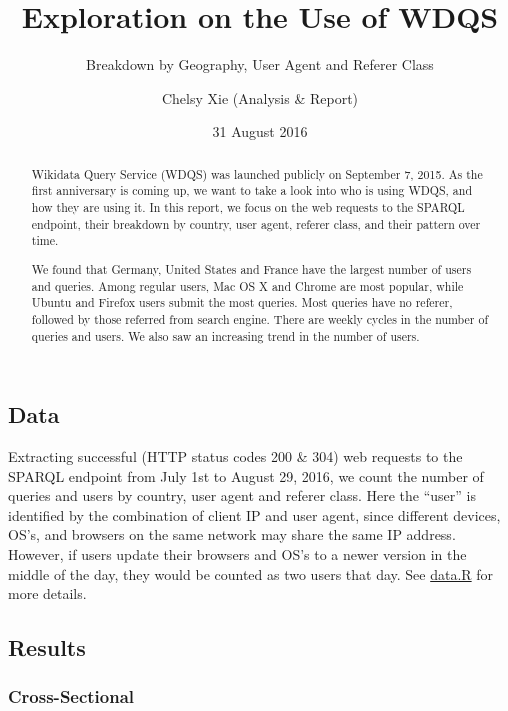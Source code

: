 \documentclass[12pt,]{article}
\title{Exploration on the Use of WDQS}
\subtitle{Breakdown by Geography, User Agent and Referer Class}
\author{Chelsy Xie (Analysis \& Report)}
\date{31 August 2016}
\begin{document}
\maketitle

\renewcommand{\abstractname}{Executive Summary}

\begin{abstract}
Wikidata Query Service (WDQS) was launched publicly on September 7, 2015. As the first anniversary is coming up, we want to take a look into who is using WDQS, and how they are using it. In this report, we focus on the web requests to the SPARQL endpoint, their breakdown by country, user agent, referer class, and their pattern over time. 

We found that Germany, United States and France have the largest number of users and queries. Among regular users, Mac OS X and Chrome are most popular, while Ubuntu and Firefox users submit the most queries. Most queries have no referer, followed by those referred from search engine. There are weekly cycles in the number of queries and users. We also saw an increasing trend in the number of users.
\end{abstract}

\subsection{Data}\label{data}

Extracting successful (HTTP status codes 200 \& 304) web requests to the
SPARQL endpoint from July 1st to August 29, 2016, we count the number of
queries and users by country, user agent and referer class. Here the
``user'' is identified by the combination of client IP and user agent,
since different devices, OS's, and browsers on the same network may
share the same IP address. However, if users update their browsers and
OS's to a newer version in the middle of the day, they would be counted
as two users that day. See
\href{https://github.com/wikimedia-research/Discovery-WDQS-Usage-Explore/blob/master/data.R}{data.R}
for more details.

\newpage

\subsection{Results}\label{results}

\subsubsection{Cross-Sectional}\label{cross-sectional}
\end{document}
